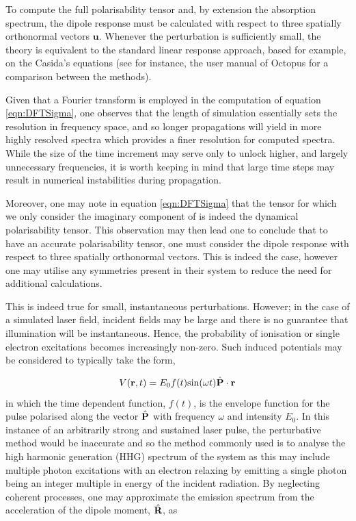 To compute the full polarisability tensor and, by extension the absorption spectrum, the dipole response must be calculated with respect to three spatially orthonormal vectors $\textbf{u}$. Whenever the perturbation is sufficiently small, the theory is equivalent to the standard linear response approach, based for example, on the Casida's equations \cite{Casida} (see for instance, the user manual of Octopus for a comparison between the methods).  

Given that a Fourier transform is employed in the computation of equation \ref{eqn:DFTSigma}, one observes that the length of simulation essentially sets the resolution in frequency space, and so longer propagations will yield in more highly resolved spectra which provides a finer resolution for computed spectra. While the size of the time increment may serve only to unlock higher, and largely unnecessary frequencies, it is worth keeping in mind that large time steps may result in numerical instabilities during propagation.  

Moreover, one may note in equation \ref{eqn:DFTSigma} that the tensor for which we only consider the imaginary component of is indeed the dynamical polarisability tensor. This observation may then lead one to conclude that to have an accurate polarisability tensor, one must consider the dipole response with respect to three spatially orthonormal vectors. This is indeed the case, however one may utilise any symmetries present in their system to reduce the need for additional calculations.

This is indeed true for small, instantaneous perturbations. However; in the case of a simulated laser field, incident fields may be large and there is no guarantee that illumination will be instantaneous. Hence, the probability of ionisation or single electron excitations becomes increasingly non-zero. Such induced potentials may be considered to typically take the form,

\begin{equation}
    V(\textbf{r},t) = E_{0}f(t)\text{sin}(\omega t)\Hat{\textbf{P}}\cdot \textbf{r}
    \label{eqn:pulse}
\end{equation}
in which the time dependent function, $f(t)$, is the envelope function for the pulse polarised along the vector $\Hat{\textbf{P}}$ with frequency $\omega$ and intensity $E_{0}$. In this instance of an arbitrarily strong and sustained laser pulse, the perturbative method would be inaccurate and so the method commonly used is to analyse the high harmonic generation (HHG) spectrum of the system as this may include multiple photon excitations with an electron relaxing by emitting a single photon being an integer multiple in energy of the incident radiation. By neglecting coherent processes, one may approximate the emission spectrum from the acceleration of the dipole moment, $\Hat{\textbf{R}}$, as

